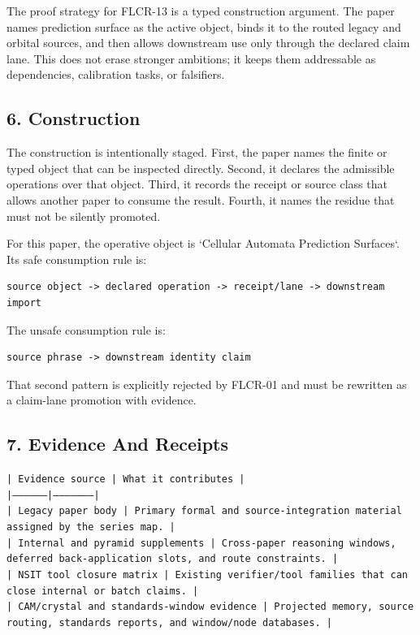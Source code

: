 \documentclass[11pt]{article}
\begin{document}
The proof strategy for FLCR-13 is a typed construction argument. The paper names prediction surface as the active object, binds it to the routed legacy and orbital sources, and then allows downstream use only through the declared claim lane. This does not erase stronger ambitions; it keeps them addressable as dependencies, calibration tasks, or falsifiers.

\subsection*{6. Construction}

The construction is intentionally staged. First, the paper names the finite or
typed object that can be inspected directly. Second, it declares the admissible
operations over that object. Third, it records the receipt or source class that
allows another paper to consume the result. Fourth, it names the residue that
must not be silently promoted.

For this paper, the operative object is `Cellular Automata Prediction Surfaces`. Its safe consumption
rule is:

\begin{verbatim}
source object -> declared operation -> receipt/lane -> downstream import
\end{verbatim}

The unsafe consumption rule is:

\begin{verbatim}
source phrase -> downstream identity claim
\end{verbatim}

That second pattern is explicitly rejected by FLCR-01 and must be rewritten as
a claim-lane promotion with evidence.

\subsection*{7. Evidence And Receipts}

\noindent\texttt{| Evidence source | What it contributes |}\\
\noindent\texttt{|-----------------|---------------------|}\\
\noindent\texttt{| Legacy paper body | Primary formal and source-integration material assigned by the series map. |}\\
\noindent\texttt{| Internal and pyramid supplements | Cross-paper reasoning windows, deferred back-application slots, and route constraints. |}\\
\noindent\texttt{| NSIT tool closure matrix | Existing verifier/tool families that can close internal or batch claims. |}\\
\noindent\texttt{| CAM/crystal and standards-window evidence | Projected memory, source routing, standards reports, and window/node databases. |}\\
\end{document}
